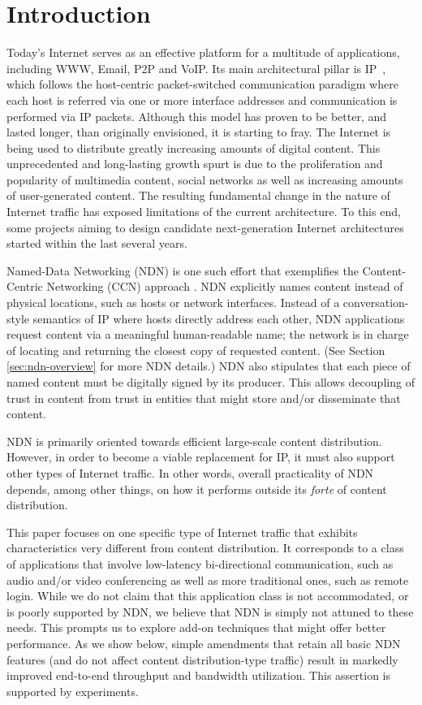 \documentclass[conference]{IEEEtran}
\begin{document}
\section{Introduction}
Today's Internet serves as an effective platform for a multitude of applications, including WWW, Email, 
P2P and VoIP. Its main architectural pillar is IP~\cite{rfc791}, which follows the host-centric 
packet-switched communication paradigm where each host is referred via one or more 
interface addresses and communication is performed via IP packets. 
Although this model has proven to be better, and lasted longer, than originally envisioned, 
it is starting to fray. The Internet is being used to distribute greatly
increasing amounts of digital content. This unprecedented and long-lasting growth spurt
is due to the proliferation and popularity of multimedia content, 
social networks as well as increasing amounts of user-generated
content. The resulting fundamental change in the nature of Internet traffic
has exposed limitations of the current architecture. To this end, 
some projects aiming to design candidate next-generation Internet
architectures started within the last several years.

Named-Data Networking (NDN) \cite{NDN} is one such effort that
exemplifies the Content-Centric Networking (CCN) approach
\cite{gritter2001architecture,Jacobson2009,koponen2007data}. 
NDN explicitly names content instead of physical locations, such as hosts or network interfaces. 
Instead of a conversation-style semantics of IP where hosts directly address each other,
NDN applications request content via a meaningful human-readable name; the network is in 
charge of locating and returning the closest copy of requested content. 
(See Section \ref{sec:ndn-overview} for more NDN details.)
NDN also stipulates that each piece of named content must be digitally signed by its producer. 
This allows decoupling of trust in content from trust in entities that might
store and/or disseminate that content. 

NDN is primarily oriented towards efficient large-scale content distribution. 
However, in order to become a viable replacement for IP, it must also support other
types of Internet traffic. In other words, overall practicality of NDN depends, among
other things, on how it performs outside its {\em forte} of content distribution. 

This paper focuses on one specific type of Internet traffic that exhibits characteristics
very different from content distribution. It corresponds to  a class of applications
that involve low-latency bi-directional communication, such as audio and/or video 
conferencing as well as more traditional ones, such as remote login.
While we do not claim that this application class is not accommodated, or is poorly
supported by NDN, we believe that NDN is simply not attuned to these needs.
This prompts us to explore add-on techniques that might offer better performance.
As we show below, simple amendments that retain all basic NDN features (and do
not affect content distribution-type traffic) result in markedly improved end-to-end
throughput and bandwidth utilization. This assertion is supported by experiments. 
\end{document}
